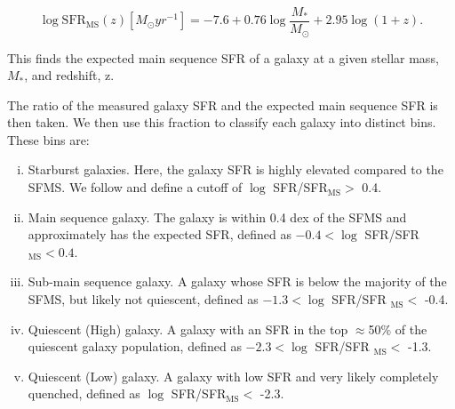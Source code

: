 \begin{equation}
\log \text{SFR}_{\text{MS}}(z)[M_\odot yr^{-1}] = -7.6 + 0.76\log\frac{M_*}{M_\odot} + 2.95\log(1+z).
\end{equation}

\noindent This finds the expected main sequence SFR of a galaxy at a given stellar mass, $M_*$, and redshift, z.

The ratio of the measured galaxy SFR and the expected main sequence SFR is then taken. We then use this fraction to classify each galaxy into distinct bins. These bins are:

\begin{enumerate}[(i)]
\item Starburst galaxies. Here, the galaxy SFR is highly elevated compared to the SFMS. We follow \citet{2019MNRAS.484.4360A} and define a cutoff of $\log$ SFR/SFR$_{\text{MS}} >$ 0.4.
\item Main sequence galaxy. The galaxy is within 0.4 dex of the SFMS and approximately has the expected SFR, defined as $-0.4 < \log$ SFR/SFR$_{\text{MS}} < 0.4$.
\item Sub-main sequence galaxy. A galaxy whose SFR is below the majority of the SFMS, but likely not quiescent, defined as $-1.3 < \log$ SFR/SFR $_{\text{MS}} < $ -0.4.
\item Quiescent (High) galaxy. A galaxy with an SFR in the top $\approx$50\% of the quiescent galaxy population, defined as $-2.3 < \log$ SFR/SFR $_{\text{MS}} <$ -1.3.
\item Quiescent (Low) galaxy. A galaxy with low SFR and very likely completely quenched, defined as $\log$ SFR/SFR$_{\text{MS}} <$ -2.3.
\end{enumerate}

